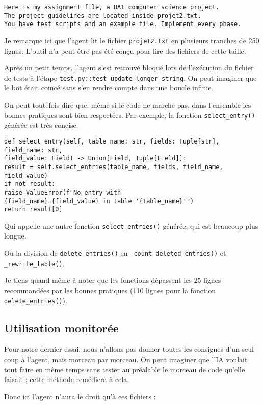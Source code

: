 \documentclass[utf8]{article}
\begin{document}
\begin{verbatim}
Here is my assignment file, a BA1 computer science project.
The project guidelines are located inside projet2.txt.
You have test scripts and an example file. Implement every phase.
\end{verbatim}

Je remarque ici que l'agent lit le fichier \texttt{projet2.txt} en plusieurs tranches de 250 lignes. L'outil n'a peut-être pas été conçu pour lire des fichiers de cette taille.

Après un petit temps, l'agent s'est retrouvé bloqué lors de l'exécution du fichier de tests à l'étape \texttt{test.py::test_update_longer_string}. On peut imaginer que le bot était coincé sans s'en rendre compte dans une boucle infinie.

On peut toutefois dire que, même si le code ne marche pas, dans l'ensemble les bonnes pratiques sont bien respectées.
Par exemple, la fonction \texttt{select_entry()} générée est très concise.

\begin{verbatim}
def select_entry(self, table_name: str, fields: Tuple[str], field_name: str,
field_value: Field) -> Union[Field, Tuple[Field]]:
result = self.select_entries(table_name, fields, field_name, field_value)
if not result:
raise ValueError(f"No entry with
{field_name}={field_value} in table '{table_name}'")
return result[0]
\end{verbatim}

Qui appelle une autre fonction \texttt{select_entries()} générée, qui est beaucoup plus longue.

Ou la division de \texttt{delete_entries()} en \texttt{_count_deleted_entries()} et \texttt{_rewrite_table()}.

Je tiens quand même à noter que les fonctions dépassent les 25 lignes recommandées par les bonnes pratiques (110 lignes pour la fonction \texttt{delete_entries()}).

\subsection{Utilisation monitorée}

Pour notre dernier essai, nous n'allons pas donner toutes les consignes d'un seul coup à l'agent, mais morceau par morceau. On peut imaginer que l'IA voulait tout faire en même temps sans tester au préalable le morceau de code qu'elle faisait ; cette méthode remédiera à cela.

Donc ici l'agent n'aura le droit qu'à ces fichiers :
\end{document}
